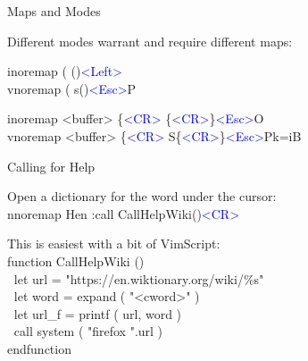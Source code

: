 \documentclass{beamer}
\newenvironment{mycode}[0]
{\ttfamily}
{}
\newcommand{\myind}[1]{\textcolor{white}{#1}}
\newcommand{\myident}[1]{\textcolor{identifier}{#1}}
\newcommand{\mykeywd}[1]{\textcolor{keyword}{#1}}
\newcommand{\mystring}[1]{\textcolor{string}{#1}}
\newcommand{\myctrlkey}[1]{\textcolor{blue}{#1}}
\begin{document}
\begin{frame}{Maps and Modes}{}

	Different modes warrant and require different maps:
	\vspace{2mm}

	\begin{mycode}
		inoremap  ( {} ()\myctrlkey{<Left>} \\
		vnoremap  (   s()\myctrlkey{<Esc>}P
	\end{mycode}

	\vspace{5mm}

	\begin{mycode}
		inoremap  <buffer>  \{\myctrlkey{<CR>} {} \{\myctrlkey{<CR>}\}\myctrlkey{<Esc>}O \\
		vnoremap  <buffer>  \{\myctrlkey{<CR>}   S\{\myctrlkey{<CR>}\}\myctrlkey{<Esc>}Pk=iB
	\end{mycode}

\end{frame}

\begin{frame}{Calling for Help}{}

	Open a dictionary for the word under the cursor: \\
	\vspace{2mm}
	\begin{mycode}
		nnoremap  Hen  :call CallHelpWiki()\myctrlkey{<CR>}
	\end{mycode}

	\vspace{5mm}
	\pause

	This is easiest with a bit of VimScript: \\
	\vspace{2mm}
	\begin{mycode}
		\mykeywd{function} CallHelpWiki () \\
			\myind{..}\mykeywd{let} url {} = \mystring{"https://en.wiktionary.org/wiki/\%s"} \\
			\myind{..}\mykeywd{let} word = \myident{expand} ( \mystring{"<cword>"} ) \\[2mm]

			\myind{..}\mykeywd{let} url\_f = \myident{printf} ( url, word ) \\[2mm]

			\myind{..}\mykeywd{call} \myident{system} ( \mystring{"firefox "}.url ) \\
		\mykeywd{endfunction} \\
	\end{mycode}

\end{frame}
\end{document}

